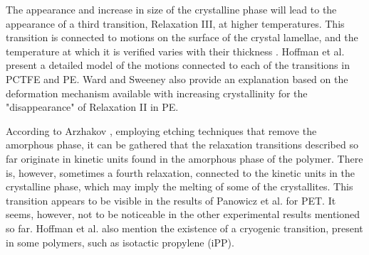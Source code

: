 The appearance and increase in size of the crystalline phase will lead to the appearance of a third transition, Relaxation III, at higher temperatures.
This transition is connected to motions on the surface of the crystal lamellae, and the temperature at which it is verified varies with their thickness \citep{khannaDynamicMechanicalRelaxations1985, hoffmanAnalysisRelaxationsPolychlorotrifluoroethylene2007}.
Hoffman et al. \citep{hoffmanAnalysisRelaxationsPolychlorotrifluoroethylene2007} present a detailed model of the motions connected to each of the transitions in PCTFE and PE.
Ward and Sweeney \citep{wardIntroductionMechanicalProperties2004} also provide an explanation based on the deformation mechanism available with increasing crystallinity for the "disappearance" of Relaxation II in PE.

According to Arzhakov \citep{arzhakovRelaxationPhysicalMechanical2019}, employing etching techniques that remove the amorphous phase, it can be gathered that the relaxation transitions described so far originate in kinetic units found in the amorphous phase of the polymer.
There is, however, sometimes a fourth relaxation, connected to the kinetic units in the crystalline phase, which may imply the melting of some of the crystallites.
This transition appears to be visible in the results of Panowicz et al. \citep{panowiczPropertiesPolyethyleneTerephthalate2021} for PET.
It seems, however, not to be noticeable in the other experimental results mentioned so far.
Hoffman et al. \citep{hoffmanAnalysisRelaxationsPolychlorotrifluoroethylene2007} also mention the existence of a cryogenic transition, present in some polymers, such as isotactic propylene (iPP).

